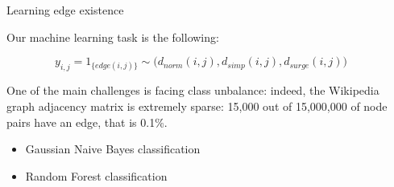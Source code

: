 \documentclass[final]{beamer}
\newlength{\onecolwid}
\newlength{\twocolwid}
\begin{document}
\begin{frame}[t]
\begin{columns}[t]
\begin{column}{\twocolwid}
%
%


\begin{columns}[t,totalwidth=\twocolwid] %

\begin{column}{\onecolwid} %


\begin{block}{Learning edge existence}

Our machine learning task is the following:

$$y_{i, j} = 1_{\{edge(i, j)\}} \sim \big(d_{norm}(i, j), d_{simp}(i, j), d_{surge}(i, j)\big)$$

One of the main challenges is facing class unbalance: indeed, the Wikipedia graph adjacency matrix is extremely sparse: 15,000 out of 15,000,000 of node pairs have an edge, that is 0.1\%.

\begin{itemize}
  \item Gaussian Naive Bayes classification
  \item Random Forest classification
\end{itemize}

\end{block}


\end{column} %

\begin{column}{\onecolwid} %



\end{column}
\end{columns}
\end{column}
\end{columns}
\end{frame}
\end{document}
